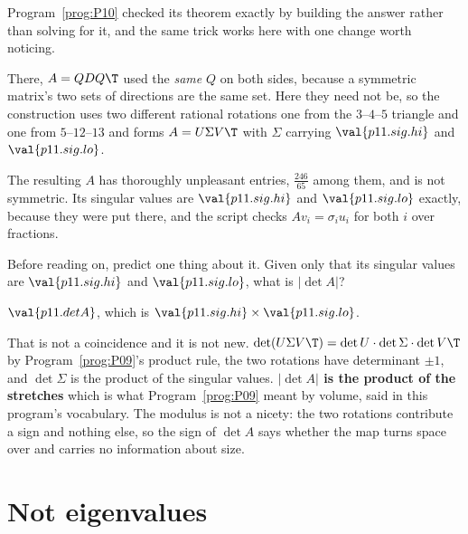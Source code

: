 \begin{fr}
Program~\ref{prog:P10} checked its theorem exactly by building the answer
rather than solving for it, and the same trick works here with one change worth
noticing.

There, $A = QDQ\T$ used the \emph{same} $Q$ on both sides, because a symmetric
matrix's two sets of directions are the same set. Here they need not be, so the
construction uses two different rational rotations \dash{} one from the
$3$--$4$--$5$ triangle and one from $5$--$12$--$13$ \dash{} and forms
$A = U\Sigma V\T$ with $\Sigma$ carrying $\val{p11.sig.hi}$ and
$\val{p11.sig.lo}$.

The resulting $A$ has thoroughly unpleasant entries, $\frac{246}{65}$ among
them, and is not symmetric. Its singular values are $\val{p11.sig.hi}$ and
$\val{p11.sig.lo}$ exactly, because they were put there, and the script checks
$Av_i = \sigma_i u_i$ for both $i$ over fractions.

Before reading on, predict one thing about it. Given only that its singular
values are $\val{p11.sig.hi}$ and $\val{p11.sig.lo}$, what is
$\lvert\det A\rvert$?
\dotline
\nextframe
\end{fr}

\begin{fr}
\begin{ansblock}
$\val{p11.detA}$, which is
$\val{p11.sig.hi} \times \val{p11.sig.lo}$.
\end{ansblock}

That is not a coincidence and it is not new. $\det(U\Sigma V\T) = \det U \cdot
\det\Sigma \cdot \det V\T$ by Program~\ref{prog:P09}'s product rule, the two
rotations have determinant $\pm 1$, and $\det\Sigma$ is the product of the
singular values. \textbf{$\lvert\det A\rvert$ is the product of the stretches}
\dash{} which is what Program~\ref{prog:P09} meant by volume, said in this
program's vocabulary. The modulus is not a nicety: the two rotations contribute
a sign and nothing else, so the sign of $\det A$ says whether the map turns
space over and carries no information about size.
\end{fr}

\section{Not eigenvalues}
\label{sec:P11-not-eigen}

